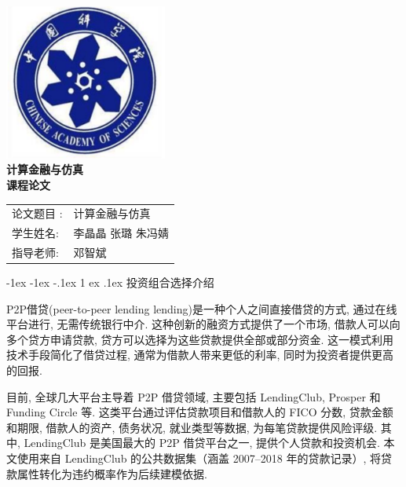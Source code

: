 \documentclass{write_paper}
\makeatletter
\renewcommand\section{\@startsection {section}{1}{\z@}%
                                   {-1ex \@plus -1ex \@minus -.1ex}%
                                   {1 ex \@plus.1ex}%
                                   {\normalfont\large\bfseries}}
\makeatother
\begin{document}
\vspace*{\fill}

\begin{center}

    \includegraphics[width=0.4\textwidth]{Figures/校徽.png}\\[1cm]
       \Huge \bfseries
      {计算金融与仿真}\\[0.5cm]
       \Huge \bfseries
      {课程论文}\\[2cm]
    
    \Large
    \begin{table}[htbp]
    \centering
    \Large
    \begin{tabular}{ll}
   {论文题目 }: & 计算金融与仿真 \\
   {学生姓名}: & 李晶晶 \quad 张璐 \quad 朱冯婧 \\
   {指导老师}: & 邓智斌 
    \end{tabular}
    \end{table}

    


\end{center}

\vspace*{\fill}
\newpage
\tableofcontents
\newpage




\section{投资组合选择介绍}


P2P借贷(peer-to-peer lending lending)是一种个人之间直接借贷的方式, 通过在线平台进行, 无需传统银行中介. 这种创新的融资方式提供了一个市场, 借款人可以向多个贷方申请贷款, 贷方可以选择为这些贷款提供全部或部分资金. 这一模式利用技术手段简化了借贷过程, 通常为借款人带来更低的利率, 同时为投资者提供更高的回报. 

目前, 全球几大平台主导着 P2P 借贷领域, 主要包括 LendingClub, Prosper 和 Funding Circle 等. 这类平台通过评估贷款项目和借款人的 FICO 分数, 贷款金额和期限, 借款人的资产, 债务状况, 就业类型等数据, 为每笔贷款提供风险评级. 其中, LendingClub 是美国最大的 P2P 借贷平台之一, 提供个人贷款和投资机会. 本文使用来自 LendingClub 的公共数据集（涵盖 2007--2018 年的贷款记录）, 将贷款属性转化为违约概率作为后续建模依据. 
\end{document}
